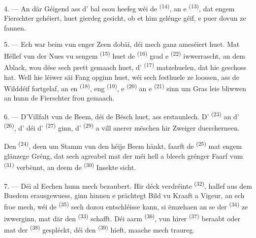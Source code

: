 4. --- An där Géigend ass d' bal esou heefeg wéi de
 \textsuperscript{(14)}, an e 
\textsuperscript{(13)}, dat engem Fierschter gehéiert, huet gierdeg gesicht, ob et
him gelénge géif, e puer dovun ze fannen.

\VUsaut{3.0mm}
\VUsaut{3.0mm}

5. --- Ech war beim  vun enger Zeen dobäi, déi mech ganz ameséiert huet.
Mat Hëllef vun der Nues vu sengem  \textsuperscript{(15)} huet
de  \textsuperscript{(16)} grad e 
\textsuperscript{(22)} iwwerrascht, an dem Ablack, wou dëse sech prett gemaach huet,
d' \textsuperscript{(17)} matzehuelen, dat hie geschoss hat. Well hie
léiwer säi Fang opginn huet, wéi sech festhuele ze loossen, ass de Wilddéif fortgelaf,
an en  \textsuperscript{(18)}, eng 
\textsuperscript{(19)}, e  \textsuperscript{(20)} an e
 \textsuperscript{(21)} sinn um Gras leie bliwwen an hunn de
Fierschter frou gemaach.

6. --- D'Villfalt vun de Beem, déi de Bësch huet, ass erstaunlech. D'
\textsuperscript{(23)} an d' \textsuperscript{(26)}, d'
déi d' \textsuperscript{(27)} ginn, d'
\textsuperscript{(29)} a vill anerer mëschen hir Zweiger duercherneen.

Den  \textsuperscript{(24)}, deen um Stamm vun den héije Beem hänkt,
faarft de  \textsuperscript{(25)} mat engem glänzege Gréng, dat sech
agreabel mat der méi hell a bleech grénger Faarf vum 
\textsuperscript{(31)} verbënnt, an deem de  \textsuperscript{(30)}
Insekte sicht.

\VUsaut{3.0mm}
\VUsaut{3.0mm}

7. --- Déi al Eechen hunn mech bezaubert. Hir déck verdréinte 
\textsuperscript{(32)}, hallef aus dem Buedem erausgewuess, ginn hinnen e prächtegt
Bild vu Kraaft a Vigeur, an ech froe mech, wéi de 
\textsuperscript{(35)} sech dozou entschléisse kann, si ëmzehaen an se der
 \textsuperscript{(34)} ze iwwerginn, mat där den 
\textsuperscript{(33)} schafft. Déi aarm  \textsuperscript{(36)}, vun
hirer  \textsuperscript{(37)} beraabt oder mat der 
\textsuperscript{(38)} gespléckt, déi den  \textsuperscript{(39)}
hieft, maache mech traureg.


